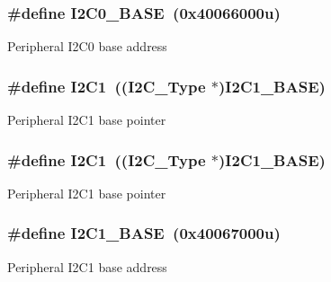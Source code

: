 \subsubsection[{\texorpdfstring{I2\+C0\+\_\+\+B\+A\+SE}{I2C0_BASE}}]{\setlength{\rightskip}{0pt plus 5cm}\#define I2\+C0\+\_\+\+B\+A\+SE~(0x40066000u)}\hypertarget{group__I2C__Peripheral__Access__Layer_gabf0928baf4e4350633ca9050b65d1939}{}\label{group__I2C__Peripheral__Access__Layer_gabf0928baf4e4350633ca9050b65d1939}
Peripheral I2\+C0 base address 
\subsubsection[{\texorpdfstring{I2\+C1}{I2C1}}]{\setlength{\rightskip}{0pt plus 5cm}\#define I2\+C1~(({\bf I2\+C\+\_\+\+Type} $\ast$){\bf I2\+C1\+\_\+\+B\+A\+SE})}\hypertarget{group__I2C__Peripheral__Access__Layer_gab45d257574da6fe1f091cc45b7eda6cc}{}\label{group__I2C__Peripheral__Access__Layer_gab45d257574da6fe1f091cc45b7eda6cc}
Peripheral I2\+C1 base pointer 
\subsubsection[{\texorpdfstring{I2\+C1}{I2C1}}]{\setlength{\rightskip}{0pt plus 5cm}\#define I2\+C1~(({\bf I2\+C\+\_\+\+Type} $\ast$){\bf I2\+C1\+\_\+\+B\+A\+SE})}\hypertarget{group__I2C__Peripheral__Access__Layer_gab45d257574da6fe1f091cc45b7eda6cc}{}\label{group__I2C__Peripheral__Access__Layer_gab45d257574da6fe1f091cc45b7eda6cc}
Peripheral I2\+C1 base pointer 
\subsubsection[{\texorpdfstring{I2\+C1\+\_\+\+B\+A\+SE}{I2C1_BASE}}]{\setlength{\rightskip}{0pt plus 5cm}\#define I2\+C1\+\_\+\+B\+A\+SE~(0x40067000u)}\hypertarget{group__I2C__Peripheral__Access__Layer_gacd72dbffb1738ca87c838545c4eb85a3}{}\label{group__I2C__Peripheral__Access__Layer_gacd72dbffb1738ca87c838545c4eb85a3}
Peripheral I2\+C1 base address 
